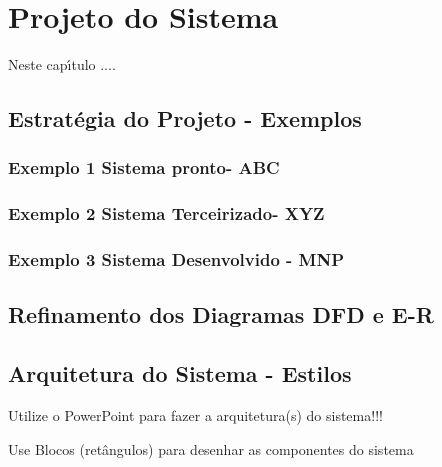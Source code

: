 
\chapter{Projeto do Sistema}

Neste cap\'{\i}tulo ....


\section{Estrat\'{e}gia do Projeto - Exemplos}

 
       \subsection{Exemplo 1 Sistema pronto- ABC}
       
       

       \subsection{Exemplo 2 Sistema Terceirizado- XYZ}
       
       
      
       \subsection{Exemplo 3 Sistema Desenvolvido - MNP}       
       
       

\section{Refinamento dos Diagramas DFD e E-R}



\section{Arquitetura do Sistema - Estilos} 

    Utilize o PowerPoint para fazer a arquitetura(s) do sistema!!!
    
    Use Blocos (ret\^{a}ngulos) para desenhar as componentes do sistema

